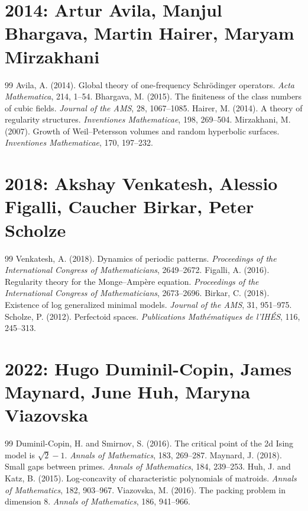 \documentclass[12pt,a4paper]{book}
\theoremstyle{definition}
\theoremstyle{remark}
\begin{document}
\section*{2014: Artur Avila, Manjul Bhargava, Martin Hairer, Maryam Mirzakhani}
\begin{thebibliography}{99}
 Avila, A. (2014). Global theory of one-frequency Schrödinger operators. \emph{Acta Mathematica}, 214, 1--54.
 Bhargava, M. (2015). The finiteness of the class numbers of cubic fields. \emph{Journal of the AMS}, 28, 1067--1085.
 Hairer, M. (2014). A theory of regularity structures. \emph{Inventiones Mathematicae}, 198, 269--504.
 Mirzakhani, M. (2007). Growth of Weil--Petersson volumes and random hyperbolic surfaces. \emph{Inventiones Mathematicae}, 170, 197--232.
\end{thebibliography}

\section*{2018: Akshay Venkatesh, Alessio Figalli, Caucher Birkar, Peter Scholze}
\begin{thebibliography}{99}
 Venkatesh, A. (2018). Dynamics of periodic patterns. \emph{Proceedings of the International Congress of Mathematicians}, 2649--2672.
 Figalli, A. (2016). Regularity theory for the Monge--Ampère equation. \emph{Proceedings of the International Congress of Mathematicians}, 2673--2696.
 Birkar, C. (2018). Existence of log generalized minimal models. \emph{Journal of the AMS}, 31, 951--975.
 Scholze, P. (2012). Perfectoid spaces. \emph{Publications Mathématiques de l'IHÉS}, 116, 245--313.
\end{thebibliography}

\section*{2022: Hugo Duminil-Copin, James Maynard, June Huh, Maryna Viazovska}
\begin{thebibliography}{99}
 Duminil-Copin, H. and Smirnov, S. (2016). The critical point of the 2d Ising model is $\sqrt{2}-1$. \emph{Annals of Mathematics}, 183, 269--287.
 Maynard, J. (2018). Small gaps between primes. \emph{Annals of Mathematics}, 184, 239--253.
 Huh, J. and Katz, B. (2015). Log-concavity of characteristic polynomials of matroids. \emph{Annals of Mathematics}, 182, 903--967.
 Viazovska, M. (2016). The packing problem in dimension 8. \emph{Annals of Mathematics}, 186, 941--966.
\end{thebibliography}
\end{document}
